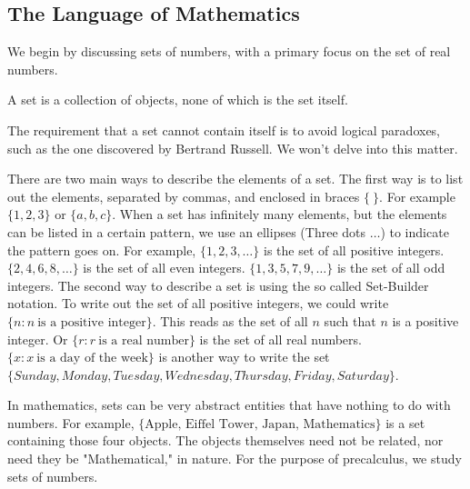 \documentclass[crop=false,class=book,oneside]{standalone}
\begin{document}
        \subsection{The Language of Mathematics}
                We begin by discussing sets of numbers,
                with a primary focus on the set of real numbers.
            \begin{definition}
                A set is a collection of objects,
                none of which is the set itself.
            \end{definition}
            \begin{remark}
                The requirement that a set cannot contain itself
                is to avoid logical paradoxes,
                such as the one discovered by Bertrand Russell.
                We won't delve into this matter.
            \end{remark}
            \begin{remark}
            There are two main ways to describe the elements of a set. The first way is to list out the elements, separated by commas, and enclosed in braces $\{\ \}$. For example $\{1,2,3\}$ or $\{a,b,c\}$. When a set has infinitely many elements, but the elements can be listed in a certain pattern, we use an ellipses (Three dots $\hdots$) to indicate the pattern goes on. For example, $\{1,2,3,\hdots\}$ is the set of all positive integers. $\{2,4,6,8,\hdots\}$ is the set of all even integers. $\{1,3,5,7,9,\hdots\}$ is the set of all odd integers. The second way to describe a set is using the so called Set-Builder notation. To write out the set of all positive integers, we could write $\{n: n\ \textrm{is a positive integer}\}$. This reads as the set of all $n$ such that $n$ is a positive integer. Or $\{r: r\ \textrm{is a real number}\}$ is the set of all real numbers. $\{x: x\ \textrm{is a day of the week}\}$ is another way to write the set $\{Sunday, Monday, Tuesday, Wednesday, Thursday, Friday, Saturday\}$.
            \end{remark}
            
            \begin{remark}
            In mathematics, sets can be very abstract entities that have nothing to do with numbers. For example, $\{\textrm{Apple, Eiffel Tower, Japan, Mathematics}\}$ is a set containing those four objects. The objects themselves need not be related, nor need they be "Mathematical," in nature. For the purpose of precalculus, we study sets of numbers.
            \end{remark}
            
\end{document}
